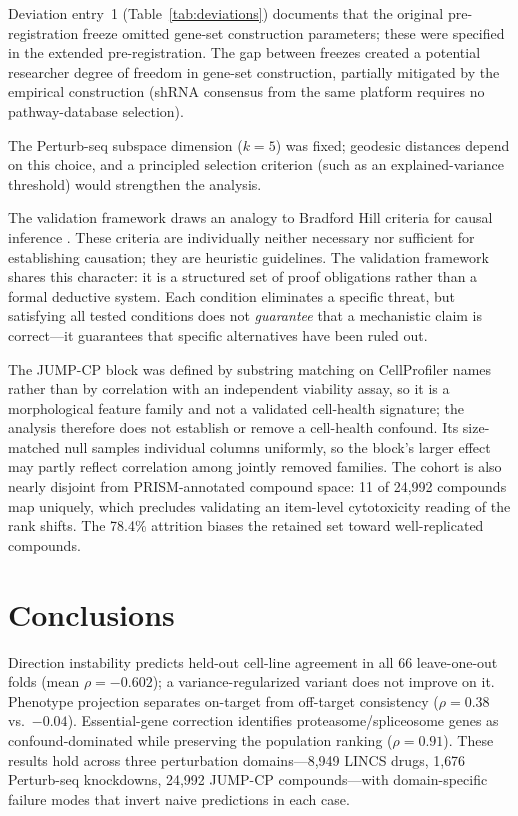 \documentclass[11pt]{article}
\begin{document}
Deviation entry~1 (Table~\ref{tab:deviations}) documents that the
original pre-registration freeze omitted gene-set construction parameters;
these were specified in the extended pre-registration. The gap between
freezes created a potential researcher degree of freedom in gene-set
construction, partially mitigated by the empirical construction (shRNA
consensus from the same platform requires no pathway-database selection).

The Perturb-seq subspace dimension ($k = 5$) was fixed; geodesic
distances depend on this choice, and a principled selection criterion
(such as an explained-variance threshold) would strengthen the analysis.

The validation framework draws an analogy to Bradford Hill criteria for causal
inference \citep{hill1965environment}. These criteria are individually
neither necessary nor
sufficient for establishing causation; they are heuristic guidelines. The
validation framework shares this character: it is a structured set of proof
obligations rather than a formal deductive system. Each condition eliminates
a specific threat, but satisfying all tested conditions does not
\emph{guarantee} that a mechanistic claim is correct---it guarantees
that specific alternatives have been ruled out.

The JUMP-CP block was defined by substring matching on CellProfiler names
rather than by correlation with an independent viability assay, so it is a
morphological feature family and not a validated cell-health signature; the
analysis therefore does not establish or remove a cell-health confound. Its
size-matched null samples individual columns uniformly, so the block's larger
effect may partly reflect correlation among jointly removed families. The
cohort is also nearly disjoint from PRISM-annotated compound space: 11 of
24{,}992 compounds map uniquely, which precludes validating an item-level
cytotoxicity reading of the rank shifts. The 78.4\% attrition biases the
retained set toward well-replicated compounds.

\section{Conclusions}

Direction instability predicts held-out cell-line agreement in all 66
leave-one-out folds (mean $\rho = -0.602$); a variance-regularized variant
does not improve on it.
Phenotype projection separates on-target from off-target consistency
($\rho = 0.38$ vs.\ $-0.04$). Essential-gene correction identifies
proteasome/spliceosome genes as confound-dominated while preserving the
population ranking ($\rho = 0.91$). These results hold across three
perturbation domains---8{,}949 LINCS drugs, 1{,}676 Perturb-seq
knockdowns, 24{,}992 JUMP-CP compounds---with domain-specific failure
modes that invert naive predictions in each case.
\end{document}

